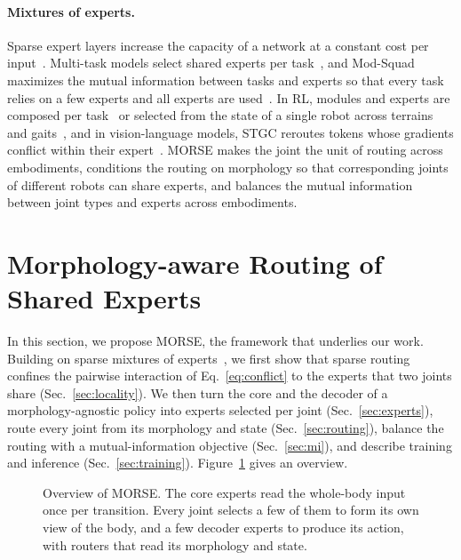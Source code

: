 \paragraph{Mixtures of experts.}
Sparse expert layers increase the capacity of a network at a constant cost per
input~\citep{shazeer2017outrageously,lepikhin2021gshard,fedus2022switch,riquelme2021vmoe}. Multi-task models select
shared experts per task~\citep{ma2018mmoe,chen2023modsquad}, and Mod-Squad maximizes the mutual information between
tasks and experts so that every task relies on a few experts and all experts are used~\citep{chen2023modsquad}. In RL,
modules and experts are composed per task~\citep{yang2020softmodularization,sodhani2021care,sun2022paco,hendawy2024moore}
or selected from the state of a single robot across terrains and gaits~\citep{huang2025moeloco}, and in vision-language
models, STGC reroutes tokens whose gradients conflict within their expert~\citep{yang2025stgc}. MORSE makes the joint
the unit of routing across embodiments, conditions the routing on morphology so that corresponding joints of different
robots can share experts, and balances the mutual information between joint types and experts across embodiments.

\section{Morphology-aware Routing of Shared Experts}
\label{sec:method}

In this section, we propose MORSE, the framework that underlies our work. Building on sparse mixtures of
experts~\citep{shazeer2017outrageously,fedus2022switch}, we first show that sparse routing confines the pairwise
interaction of Eq.~\eqref{eq:conflict} to the experts that two joints share (Sec.~\ref{sec:locality}). We then turn the
core and the decoder of a morphology-agnostic policy into experts selected per joint (Sec.~\ref{sec:experts}), route
every joint from its morphology and state (Sec.~\ref{sec:routing}), balance the routing with a mutual-information
objective (Sec.~\ref{sec:mi}), and describe training and inference (Sec.~\ref{sec:training}).
Figure~\ref{fig:overview} gives an overview.

\begin{figure}[t]
\centering
\fbox{\rule{0pt}{1.6in}\rule{0.95\textwidth}{0pt}}
\caption{Overview of MORSE. The core experts read the whole-body input once per transition. Every joint selects a few
of them to form its own view of the body, and a few decoder experts to produce its action, with routers that read its
morphology and state.}
\label{fig:overview}
\end{figure}

